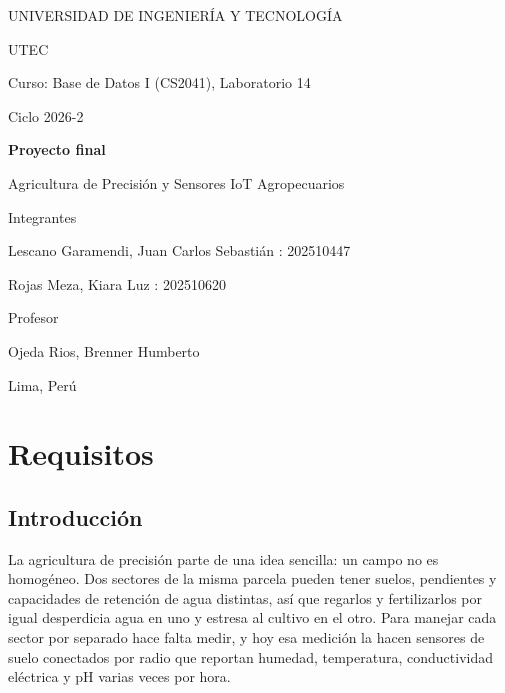 \documentclass[11pt,letterpaper]{article}
\begin{document}
\hypersetup{pageanchor=false}
\begin{titlepage}
\centering
{\large UNIVERSIDAD DE INGENIERÍA Y TECNOLOGÍA\par}
\vspace{0.3cm}
{\large UTEC\par}
\vspace{2.2cm}
{\normalsize Curso: Base de Datos I (CS2041), Laboratorio 14\par}
\vspace{0.3cm}
{\normalsize Ciclo 2026-2\par}
\vspace{2cm}
{\LARGE\bfseries Proyecto final\par}
\vspace{0.4cm}
{\Large Agricultura de Precisión y Sensores IoT Agropecuarios\par}
\vspace{2.4cm}
{\large Integrantes\par}
\vspace{0.3cm}
Lescano Garamendi, Juan Carlos Sebastián : 202510447\par
Rojas Meza, Kiara Luz : 202510620\par
\vspace{1.6cm}
{\large Profesor\par}
\vspace{0.3cm}
Ojeda Rios, Brenner Humberto\par
\vfill
{\normalsize Lima, Perú\par}
\end{titlepage}
\hypersetup{pageanchor=true}

\tableofcontents
\newpage

\section{Requisitos}

\subsection{Introducción}

La agricultura de precisión parte de una idea sencilla: un campo no es homogéneo. Dos sectores de la misma parcela pueden tener suelos, pendientes y capacidades de retención de agua distintas, así que regarlos y fertilizarlos por igual desperdicia agua en uno y estresa al cultivo en el otro. Para manejar cada sector por separado hace falta medir, y hoy esa medición la hacen sensores de suelo conectados por radio que reportan humedad, temperatura, conductividad eléctrica y pH varias veces por hora.
\end{document}
